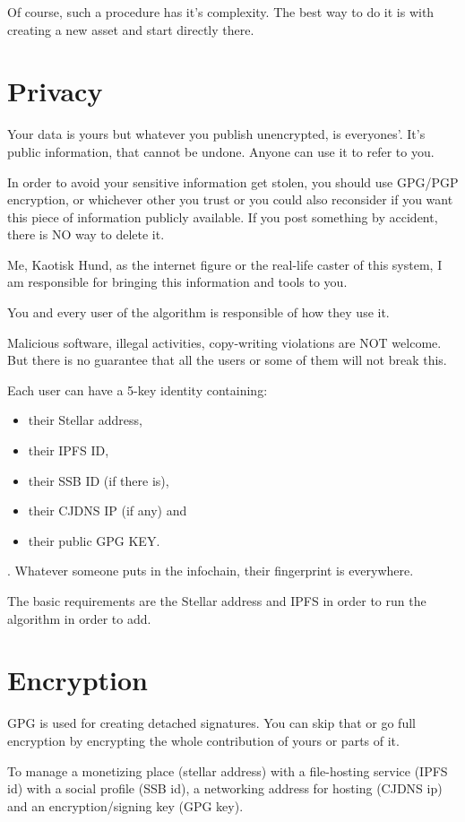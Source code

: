 \documentclass[10pt,a4paper,twocolumn]{paper}
\begin{document}
	Of course, such a procedure has it's complexity. The best way to do it is with creating a new asset and start directly there.


	\section{Privacy}\label{privacy}

	Your data is yours but whatever you publish unencrypted, is everyones'. It's public information, that cannot be undone. Anyone can use it to refer to you.

	In order to avoid your sensitive information get stolen, you should use GPG/PGP encryption, or whichever other you trust or you could also reconsider if you want this piece of information publicly available. If you post something by accident, there is NO way to delete it.

	Me, Kaotisk Hund, as the internet figure or the real-life caster of this system, I am responsible for bringing this information and tools to you. 
	
	You and every user of the algorithm is responsible of how they use it.

	Malicious software, illegal activities, copy-writing violations are NOT welcome. But there is no guarantee that all the users or some of them will not break this.

	Each user can have a 5-key identity containing: \begin{itemize}
	\item their Stellar address,
	\item their IPFS ID,
	\item their SSB ID (if there is),
	\item their CJDNS IP (if any) and
	\item their public GPG KEY.
	\end{itemize}. Whatever someone puts in the infochain, their fingerprint is everywhere.
	
	The basic requirements are the Stellar address and IPFS in order to run the algorithm in order to add.
	
	\section{Encryption}
	GPG is used for creating detached signatures. You can skip that or go full encryption by encrypting the whole contribution of yours or parts of it.
	
	To manage a monetizing place (stellar address) with a file-hosting service (IPFS id) with a social profile (SSB id), a networking address for hosting (CJDNS ip) and an encryption/signing key (GPG key).
\end{document}
